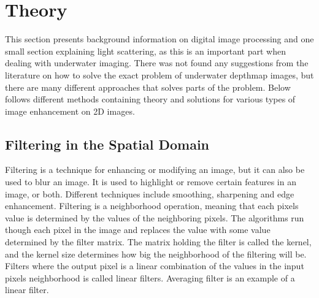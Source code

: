 \section{Theory}\label{theory}
This section presents background information on digital image processing and one small section explaining light scattering, as this is an important part when dealing with underwater imaging.
There was not found any suggestions from the literature on how to solve the exact problem of underwater depthmap images, but there are many different approaches that solves parts of the problem.
Below follows different methods containing theory and solutions for various types of image enhancement on 2D images. 


\subsection{Filtering in the Spatial Domain}

Filtering is a technique for enhancing or modifying an image, but it can also be used to blur an image. It is used to highlight or remove certain features in an image, or both. Different techniques include smoothing, sharpening and edge enhancement. 
Filtering is a neighborhood operation, meaning that each pixels value is determined by the values of the neighboring pixels. The algorithms run though each pixel in the image and replaces the value with some value determined by the filter matrix. The matrix holding the filter is called the kernel, and the kernel size determines how big the neighborhood of the filtering will be. Filters where the output pixel is a linear combination of the values in the input pixels neighborhood is called linear filters. Averaging filter is an example of a linear filter.\cite{book:digital_image_processing}\cite{website:mathworks_spatial_filtering}\cite{book:machine_vision}

